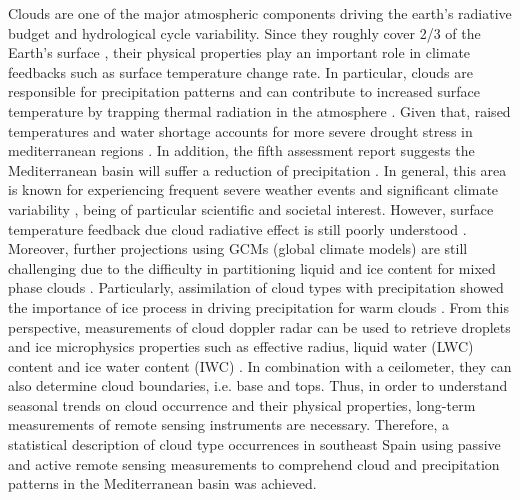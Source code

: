 \documentclass[journal abbreviation, manuscript]{copernicus}
\begin{document}


\introduction  %

Clouds are one of the major atmospheric components driving the earth's radiative budget and hydrological cycle variability. Since they roughly cover 2/3 of the Earth's surface \cite{ipccXXX}, their physical properties play an important role in climate feedbacks such as surface temperature change rate. In particular, clouds are responsible for precipitation patterns and can contribute to increased surface temperature by trapping thermal radiation in the atmosphere \cite{ipccXXX}. Given that, raised temperatures and water shortage accounts for more severe drought stress in mediterranean regions \cite{antoniogazol2024XXX, hoerling2012}. In addition, the fifth assessment report \cite{ipccXXX} suggests the Mediterranean basin will suffer a reduction of precipitation \cite{NoahXXX, ipcc}. In general, this area is known for experiencing frequent severe weather events and significant climate variability \cite{MarinouXXX,XXX}, being of particular scientific and societal interest. 
However, surface temperature feedback due cloud radiative effect is still poorly understood \cite{ipccXXX}. Moreover,  further projections using GCMs (global climate models) are still challenging due to the difficulty in partitioning liquid and ice content for mixed phase clouds \cite{komurcu2014XXX}.  Particularly, assimilation of cloud types with precipitation showed the importance of ice process in driving precipitation for warm clouds \cite{Buhl2016, Mülmenstädt2015}. 
%
From this perspective, measurements of cloud doppler radar can be used to retrieve droplets and ice microphysics properties such as effective radius, liquid water (LWC) content and ice water content (IWC) \cite{XXX, XXX, XXX}. In combination with a ceilometer, they can also determine cloud boundaries, i.e. base and tops. Thus, in order to understand seasonal trends on cloud occurrence and their physical properties, long-term measurements of remote sensing instruments are necessary. 
%
Therefore, a statistical description of cloud type occurrences in southeast Spain using passive and active remote sensing measurements to comprehend cloud and precipitation patterns in the Mediterranean basin was achieved. 
\end{document}
